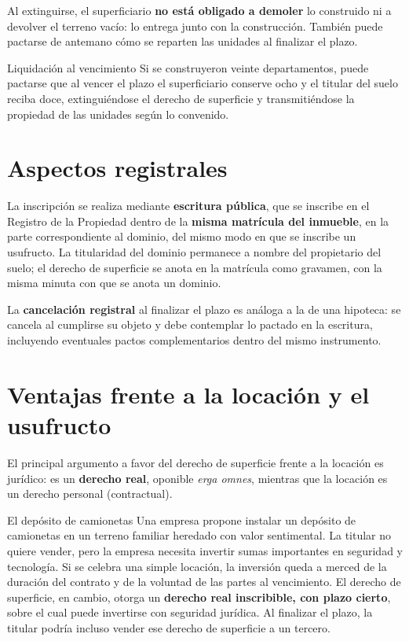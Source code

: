 \documentclass[12pt,oneside]{book}
\begin{document}
Al extinguirse, el superficiario \textbf{no está obligado a demoler} lo construido ni a devolver el terreno vacío: lo entrega junto con la construcción. También puede pactarse de antemano cómo se reparten las unidades al finalizar el plazo.

\begin{example}{Liquidación al vencimiento}
Si se construyeron veinte departamentos, puede pactarse que al vencer el plazo el superficiario conserve ocho y el titular del suelo reciba doce, extinguiéndose el derecho de superficie y transmitiéndose la propiedad de las unidades según lo convenido.
\end{example}

\section{Aspectos registrales}

La inscripción se realiza mediante \textbf{escritura pública}, que se inscribe en el Registro de la Propiedad dentro de la \textbf{misma matrícula del inmueble}, en la parte correspondiente al dominio, del mismo modo en que se inscribe un usufructo. La titularidad del dominio permanece a nombre del propietario del suelo; el derecho de superficie se anota en la matrícula como gravamen, con la misma minuta con que se anota un dominio.

La \textbf{cancelación registral} al finalizar el plazo es análoga a la de una hipoteca: se cancela al cumplirse su objeto y debe contemplar lo pactado en la escritura, incluyendo eventuales pactos complementarios dentro del mismo instrumento.

\section{Ventajas frente a la locación y el usufructo}

El principal argumento a favor del derecho de superficie frente a la locación es jurídico: es un \textbf{derecho real}, oponible \emph{erga omnes}, mientras que la locación es un derecho personal (contractual).

\begin{example}{El depósito de camionetas}
Una empresa propone instalar un depósito de camionetas en un terreno familiar heredado con valor sentimental. La titular no quiere vender, pero la empresa necesita invertir sumas importantes en seguridad y tecnología. Si se celebra una simple locación, la inversión queda a merced de la duración del contrato y de la voluntad de las partes al vencimiento. El derecho de superficie, en cambio, otorga un \textbf{derecho real inscribible, con plazo cierto}, sobre el cual puede invertirse con seguridad jurídica. Al finalizar el plazo, la titular podría incluso vender ese derecho de superficie a un tercero.
\end{example}
\end{document}

